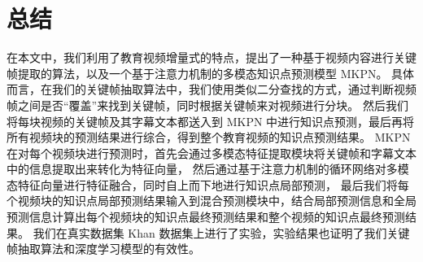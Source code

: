 \chapter{总结}
    在本文中，我们利用了教育视频增量式的特点，提出了一种基于视频内容进行关键帧提取的算法，以及一个基于注意力机制的多模态知识点预测模型 MKPN。
    具体而言，在我们的关键帧抽取算法中，我们使用类似二分查找的方式，通过判断视频帧之间是否“覆盖”来找到关键帧，同时根据关键帧来对视频进行分块。
    然后我们将每块视频的关键帧及其字幕文本都送入到 MKPN 中进行知识点预测，最后再将所有视频块的预测结果进行综合，得到整个教育视频的知识点预测结果。
    MKPN 在对每个视频块进行预测时，首先会通过多模态特征提取模块将关键帧和字幕文本中的信息提取出来转化为特征向量，
    然后通过基于注意力机制的循环网络对多模态特征向量进行特征融合，同时自上而下地进行知识点局部预测，
    最后我们将每个视频块的知识点局部预测结果输入到混合预测模块中，结合局部预测信息和全局预测信息计算出每个视频块的知识点最终预测结果和整个视频的知识点最终预测结果。
    我们在真实数据集 Khan 数据集上进行了实验，实验结果也证明了我们关键帧抽取算法和深度学习模型的有效性。
